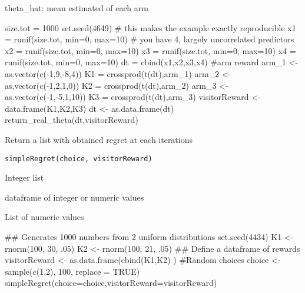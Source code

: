 \documentclass[letterpaper]{book}
\begin{document}
%
\begin{Value}
theta\_hat: mean estimated of each arm
\end{Value}
%
\begin{Examples}
\begin{ExampleCode}
size.tot = 1000
set.seed(4649)                          # this makes the example exactly reproducible
x1 = runif(size.tot, min=0, max=10)          # you have 4, largely uncorrelated predictors
x2 = runif(size.tot, min=0, max=10)
x3 = runif(size.tot, min=0, max=10)
x4 = runif(size.tot, min=0, max=10)
dt = cbind(x1,x2,x3,x4)
#arm reward
arm_1 <-  as.vector(c(-1,9,-8,4))
K1 = crossprod(t(dt),arm_1)
arm_2 <-  as.vector(c(-1,2,1,0))
K2 = crossprod(t(dt),arm_2)
arm_3 <-  as.vector(c(-1,-5,1,10))
K3 = crossprod(t(dt),arm_3)
visitorReward <-  data.frame(K1,K2,K3)
dt <- as.data.frame(dt)
return_real_theta(dt,visitorReward)
\end{ExampleCode}
\end{Examples}
%
\begin{Description}\relax
Return a list with obtained regret at each iterations
\end{Description}
%
\begin{Usage}
\begin{verbatim}
simpleRegret(choice, visitorReward)
\end{verbatim}
\end{Usage}
%
\begin{Arguments}
\begin{ldescription}
\item[\code{choice}] Integer list

\item[\code{visitorReward}] dataframe of integer or numeric values
\end{ldescription}
\end{Arguments}
%
\begin{Value}
List of numeric values
\end{Value}
%
\begin{Examples}
\begin{ExampleCode}
## Generates 1000 numbers from 2 uniform distributions
set.seed(4434)
K1 <- rnorm(100, 30, .05)
K2 <- rnorm(100, 21, .05)
## Define a dataframe of rewards
visitorReward <- as.data.frame(cbind(K1,K2) )
#Random choices
choice <- sample(c(1,2), 100, replace = TRUE)
simpleRegret(choice=choice,visitorReward=visitorReward)

\end{ExampleCode}
\end{Examples}
\end{document}
